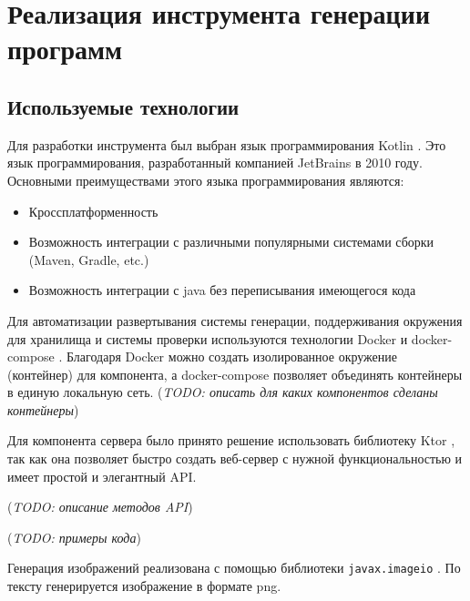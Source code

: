 \section{Реализация инструмента генерации программ}

\subsection{Используемые технологии}

Для разработки инструмента был выбран язык программирования Kotlin \cite{kotlin}. Это язык
программирования, разработанный компанией JetBrains в 2010 году. Основными
преимуществами этого языка программирования являются:
\begin{itemize}
    \item Кроссплатформенность
    \item Возможность интеграции с различными популярными системами сборки
          (Maven, Gradle, etc.)
    \item Возможность интеграции с java без переписывания имеющегося кода
\end{itemize}

Для автоматизации развертывания системы генерации, поддерживания окружения для хранилища и
системы проверки используются технологии Docker \cite{docker} и docker-compose \cite{docker-compose}.
Благодаря Docker можно создать изолированное окружение (контейнер) для компонента, а docker-compose
позволяет объединять контейнеры в единую локальную сеть.
(\textit{TODO: описать для каких компонентов сделаны контейнеры})

Для компонента сервера было принято решение использовать библиотеку Ktor \cite{ktor}, так как
она позволяет быстро создать веб-сервер с нужной функциональностью и имеет простой и элегантный API.

(\textit{TODO: описание методов API})

(\textit{TODO: примеры кода})

Генерация изображений реализована с помощью библиотеки \texttt{javax.imageio}
\cite{imageio}. По тексту генерируется изображение в формате png.